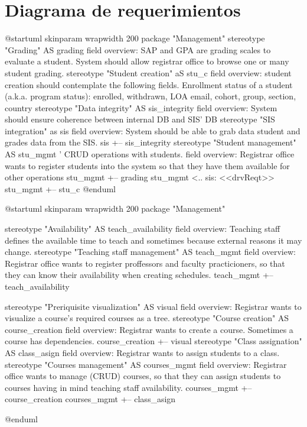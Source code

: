\section{Diagrama de requerimientos}

\begin{plantuml}
@startuml
    skinparam wrapwidth 200
    package "Management" {
    stereotype "Grading" AS grading{
        {field} overview: SAP and GPA are grading scales to evaluate a student. System should allow registrar office to browse one or many student grading.
    }
    stereotype "Student creation" aS stu_c{
        {field} overview: student creation should contemplate the following fields.
        Enrollment status of a student (a.k.a. program status): enrolled, withdrawn, LOA
        email, cohort, group, section, country
    }
    stereotype "Data integrity" AS sis_integrity {
        {field} overview: System should ensure coherence between internal DB and SIS' DB
    }
    stereotype "SIS integration" as sis {
        {field} overview: System should be able to grab data student and grades data from the SIS.
    }
    sis +-- sis_integrity
    stereotype "Student management" AS stu_mgmt{
    ' CRUD operations with students.
        {field} overview: Registrar office wants to register students into the system so that they have them available for other operations
    }
    stu_mgmt +-- grading
    stu_mgmt <.. sis: <<drvReqt>>
    stu_mgmt +-- stu_c
    }
@enduml
\end{plantuml}

\begin{plantuml}
@startuml
    skinparam wrapwidth 200
    package "Management" {
    stereotype "Availability" AS teach_availability {
        {field} overview: Teaching staff defines the available time to teach and sometimes because external reasons it may change.
    }
    stereotype "Teaching staff management" AS teach_mgmt {
        {field} overview: Registrar office wants to register proffessors and faculty practicioners, so that they can know their availability when creating schedules.
    }
    teach_mgmt +-- teach_availability

    stereotype "Preriquisite visualization" AS visual {
        {field} overview: Registrar wants to visualize a course's required courses as a tree.
    }
    stereotype "Course creation" AS course_creation {
        {field} overview: Registrar wants to create a course. Sometimes a course has dependencies.
    }
    course_creation +-- visual
    stereotype "Class assignation" AS class_asign {
        {field} overview: Registrar wants to assign students to a class.
    }
    stereotype "Courses management" AS courses_mgmt{
        {field} overview: Registrar office wants to manage (CRUD) courses, so that they can assign students to courses having in mind teaching staff availability.
    }
    courses_mgmt +-- course_creation
    courses_mgmt +-- class_asign
    }
@enduml
\end{plantuml}



